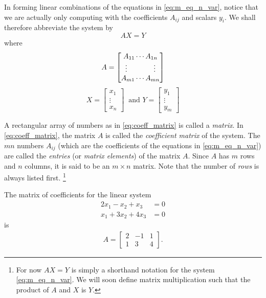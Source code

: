 \documentclass[12pt,letterpaper,reqno]{article}
\numberwithin{equation}{section}
\newcommand{\ti}[1]{\textit{#1}}
\begin{document}
	In forming linear combinations of the equations in \eqref{eq:m_eq_n_var}, notice that we are actually only computing with the coefficients $A_{ij}$ and scalars $y_i$. We shall therefore abbreviate the system by
	\begin{equation}
		AX=Y
	\end{equation}
	where 
	\begin{equation}\label{eq:coeff_matrix}
		A=\begin{bmatrix}
			A_{11} \cdots A_{1n} \\
			\vdots \hspace{1.3cm} \vdots \\
			A_{m1} \cdots A_{mn}
		\end{bmatrix}
	\end{equation} 
	\begin{equation}
		X=\begin{bmatrix}
			x_1 \\ \vdots \\ x_n
		\end{bmatrix} \ \text{ and } Y= \begin{bmatrix}
			y_1 \\ \vdots \\ y_m
		\end{bmatrix}
	\end{equation} 
\begin{defn} \label{def:coefficient_matrix}
	A rectangular array of numbers as in \eqref{eq:coeff_matrix} is called a \ti{matrix}. In \eqref{eq:coeff_matrix}, the matrix $A$ is called the \ti{coefficient matrix} of the system. The $mn$ numbers $A_{ij}$ (which are the coefficients of the equations in \eqref{eq:m_eq_n_var}) are called the \ti{entries} (or \ti{matrix elements}) of the matrix $A$. Since $A$ has $m$ rows and $n$ columns, it is said to be an $m \times n$ matrix. Note that the number of \ti{rows} is always listed first. \footnote{For now $AX=Y$ is simply a shorthand notation for the system \eqref{eq:m_eq_n_var}.
	We will soon define matrix multiplication such that the product of $A$ and $X$ is $Y$.}
\end{defn}

\begin{example}
	The matrix of coefficients for the linear system
		\begin{align*}
		2x_1-x_2+x_3&=0 \\
		x_1+3x_2+4x_3&=0
	\end{align*} 
is
\begin{align*}
	A=\begin{bmatrix}
		2&-1&1 \\ 1&3&4
	\end{bmatrix}.
\end{align*}	
\end{example}
\end{document}
